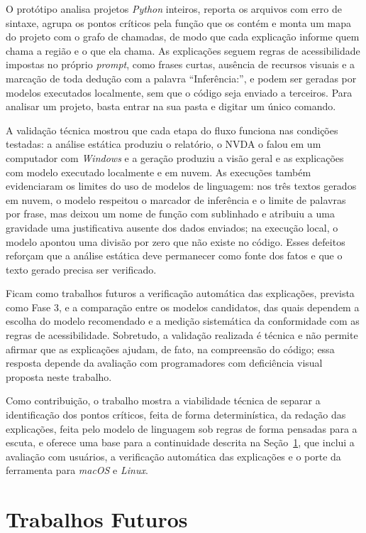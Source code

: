 \documentclass[
    12pt,                   %
    openright,              %
    oneside,                %
    a4paper,                %
    sumario=tradicional,    %
    english,                %
    brazil,                 %
    ]{abntex2}
\begin{document}
O protótipo analisa projetos \textit{Python} inteiros, reporta os arquivos com erro de sintaxe, agrupa os pontos críticos pela função que os contém e monta um mapa do projeto com o grafo de chamadas, de modo que cada explicação informe quem chama a região e o que ela chama. As explicações seguem regras de acessibilidade impostas no próprio \textit{prompt}, como frases curtas, ausência de recursos visuais e a marcação de toda dedução com a palavra \enquote{Inferência:}, e podem ser geradas por modelos executados localmente, sem que o código seja enviado a terceiros. Para analisar um projeto, basta entrar na sua pasta e digitar um único comando.

A validação técnica mostrou que cada etapa do fluxo funciona nas condições testadas: a análise estática produziu o relatório, o NVDA o falou em um computador com \textit{Windows} e a geração produziu a visão geral e as explicações com modelo executado localmente e em nuvem. As execuções também evidenciaram os limites do uso de modelos de linguagem: nos três textos gerados em nuvem, o modelo respeitou o marcador de inferência e o limite de palavras por frase, mas deixou um nome de função com sublinhado e atribuiu a uma gravidade uma justificativa ausente dos dados enviados; na execução local, o modelo apontou uma divisão por zero que não existe no código. Esses defeitos reforçam que a análise estática deve permanecer como fonte dos fatos e que o texto gerado precisa ser verificado.

Ficam como trabalhos futuros a verificação automática das explicações, prevista como Fase 3, e a comparação entre os modelos candidatos, das quais dependem a escolha do modelo recomendado e a medição sistemática da conformidade com as regras de acessibilidade. Sobretudo, a validação realizada é técnica e não permite afirmar que as explicações ajudam, de fato, na compreensão do código; essa resposta depende da avaliação com programadores com deficiência visual proposta neste trabalho.

Como contribuição, o trabalho mostra a viabilidade técnica de separar a identificação dos pontos críticos, feita de forma determinística, da redação das explicações, feita pelo modelo de linguagem sob regras de forma pensadas para a escuta, e oferece uma base para a continuidade descrita na Seção~\ref{sec:futuros}, que inclui a avaliação com usuários, a verificação automática das explicações e o porte da ferramenta para \textit{macOS} e \textit{Linux}.


\section{Trabalhos Futuros}\label{sec:futuros}
\end{document}

